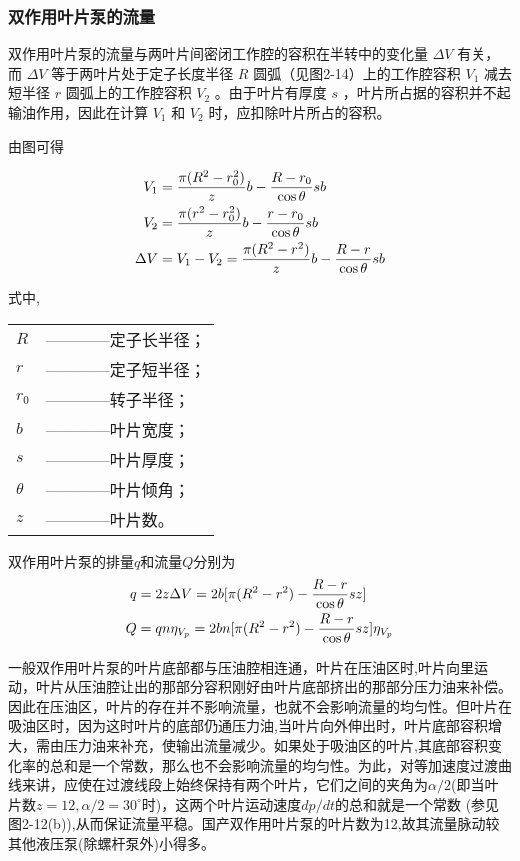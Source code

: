 \subsubsection{双作用叶片泵的流量}

双作用叶片泵的流量与两叶片间密闭工作腔的容积在半转中的变化量 $\Delta V$ 有关，而 $\Delta V$ 等于两叶片处于定子长度半径 $R$ 圆弧（见图2-14）上的工作腔容积 $V_{1}$ 减去短半径 $r$ 圆弧上的工作腔容积 $V_{2}$ 。由于叶片有厚度 $s$ ，叶片所占据的容积并不起输油作用，因此在计算 $V_{1}$ 和 $V_{2}$ 时，应扣除叶片所占的容积。

由图可得

\begin{align}
V_{1}&=\frac{\pi (R^{2}-r_{0}^{2})}{z} b- \frac{R-r_{0}}{\cos \theta} sb \notag \\
V_{2}&=\frac{\pi (r^{2}-r_{0}^{2})}{z} b- \frac{r-r_{0}}{\cos \theta} sb \notag \\
\Delta V&=V_{1}-V_{2}=\frac{\pi (R^{2}-r^{2})}{z} b- \frac{R-r}{\cos \theta} sb \notag
\end{align}

\noindent 式中, 
\begin{tabular}[t]{ll}
 $R$ & ————定子长半径； \\
 $r$ & ————定子短半径； \\
 $r_{0}$ & ————转子半径； \\
 $b$ & ————叶片宽度； \\
 $s$ & ————叶片厚度； \\
 $\theta$ & ————叶片倾角；\\
 $z$ & ————叶片数。
\end{tabular}

双作用叶片泵的排量$q$和流量$Q$分别为
\begin{align}
q&=2z\Delta V=2b[\pi (R^{2}-r^{2})-\frac{R-r}{\cos \theta}sz] \notag \\
Q&=qn\eta _{V_{p}}=2bn[\pi(R^{2}-r^{2})-\frac{R-r}{\cos \theta}sz]\eta _{V_{p}}
\end{align}

一般双作用叶片泵的叶片底部都与压油腔相连通，叶片在压油区时,叶片向里运动，叶片从压油腔让出的那部分容积刚好由叶片底部挤出的那部分压力油来补偿。因此在压油区，叶片的存在并不影响流量，也就不会影响流量的均匀性。但叶片在吸油区时，因为这时叶片的底部仍通压力油,当叶片向外伸出时，叶片底部容积增大，需由压力油来补充，使输出流量减少。如果处于吸油区的叶片,其底部容积变化率的总和是一个常数，那么也不会影响流量的均匀性。为此，对等加速度过渡曲线来讲，应使在过渡线段上始终保持有两个叶片，它们之间的夹角为$\alpha/2$(即当叶片数$z=12,\alpha/2=30^{\circ}$时)，这两个叶片运动速度$dp/dt$的总和就是一个常数 (参见图2-12(b)),从而保证流量平稳。国产双作用叶片泵的叶片数为12,故其流量脉动较其他液压泵(除螺杆泵外)小得多。

